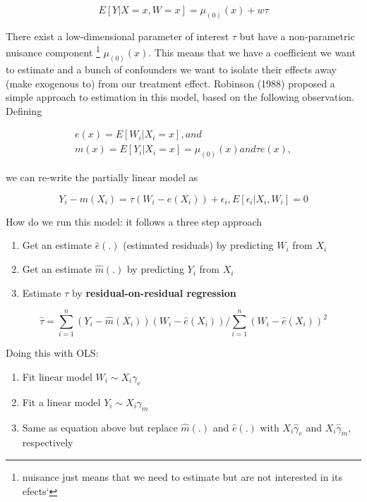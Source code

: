 \documentclass{article}
\begin{document}
\begin{equation}
    E [ Y | X =x, W =x] = \mu_{(0)} (x) + w \tau
\end{equation}

There exist a low-dimensional parameter of interest $\tau$ but have a non-parametric nuisance component \footnote{nuisance just means that we need to estimate but are not interested in its efects`} $\mu_{(0)} (x)$. This means that we have a coefficient we want to estimate and a bunch of confounders we want to isolate their effects away (make exogenous to) from our treatment effect. Robinson (1988) proposed a simple approach to estimation in this model, based on the following observation. Defining 

\begin{equation}
\begin{aligned}
    e (x) = E [W_i | X_i = x], and \\
    m (x) = E [Y_i | X_i = x] = \mu_{(0)} (x) and \tau e(x),
\end{aligned}
\end{equation}

we can re-write the partially linear model as 

\begin{equation}
    Y_i - m(X_i) = \tau (W_i - e (X_i)) + \epsilon_i , E [\epsilon_i | X_i , W_i] = 0
\end{equation}

How do we run this model: it follows a three step approach

\begin{enumerate}
    \item Get an estimate $\hat{e}(.)$ (estimated residuals) by predicting $W_i$ from $X_i$
    \item Get an estimate $\hat{m}(.)$ by predicting $Y_i$ from $X_i$
    \item Estimate $\tau$ by \textbf{residual-on-residual regression}
\end{enumerate}

\begin{equation}
    \hat{\tau} = \sum_{i=1}^n (Y_i - \hat{m} (X_i)) (W_i - \hat{e}(X_i)) / \sum_{i=1}^n (W_i - \hat{e}(X_i))^2
\end{equation}

Doing this with OLS:

\begin{enumerate}
    \item Fit linear model $W_i \sim X_i \gamma_e$
    \item Fit a linear model $Y_i \sim X_i \gamma_m$
    \item Same as equation above but replace $\hat{m}(.)$ and $\hat{e}(.)$ with $X_i \hat{\gamma}_e$ and $X_i \hat{\gamma}_m$, respectively
\end{enumerate}
\end{document}
